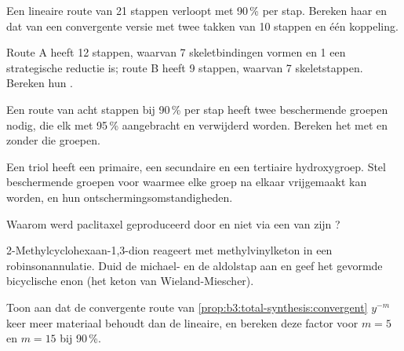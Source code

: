 \begin{exercise}[$\star\star$]\label{exo:b3:total-synthesis:5}
Een lineaire route van 21 stappen verloopt met 90\,\% per stap. Bereken
haar  en dat van een convergente versie met twee takken
van 10 stappen en één koppeling.
\end{exercise}

\begin{exercise}[$\star\star$]\label{exo:b3:total-synthesis:6}
Route A heeft 12 stappen, waarvan 7 skeletbindingen vormen en 1 een
strategische reductie is; route B heeft 9 stappen, waarvan 7 skeletstappen.
Bereken hun .
\end{exercise}

\begin{exercise}[$\star\star$]\label{exo:b3:total-synthesis:7}
Een route van acht stappen bij 90\,\% per stap heeft twee beschermende
groepen nodig, die elk met 95\,\% aangebracht en verwijderd worden.
Bereken het  met en zonder die groepen.
\end{exercise}

\begin{exercise}[$\star\star$]\label{exo:b3:total-synthesis:8}
Een triol heeft een primaire, een secundaire en een tertiaire
hydroxygroep. Stel beschermende groepen voor waarmee elke groep na elkaar
vrijgemaakt kan worden, en hun ontschermingsomstandigheden.
\end{exercise}

\begin{exercise}[$\star\star$]\label{exo:b3:total-synthesis:9}
Waarom werd paclitaxel geproduceerd door  en niet via een van
zijn ?
\end{exercise}

\begin{exercise}[$\star\star\star$]\label{exo:b3:total-synthesis:10}
2-Methylcyclohexaan-1,3-dion reageert met methylvinylketon in een
robinsonannulatie. Duid de michael- en de aldolstap aan en geef het
gevormde bicyclische enon (het keton van Wieland-Miescher).
\end{exercise}

\begin{exercise}[$\star\star\star$]\label{exo:b3:total-synthesis:11}
Toon aan dat de convergente route van \cref{prop:b3:total-synthesis:convergent}
$y^{-m}$ keer meer materiaal behoudt dan de lineaire, en bereken deze factor voor $m = 5$ en
$m = 15$ bij 90\,\%.
\end{exercise}

